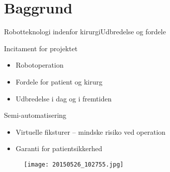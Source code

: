 \section{Baggrund}
\begin{frame}{Robotteknologi indenfor kirurgi}{Udbredelse og fordele}
\begin{minipage}[b]{0.55\linewidth}
\begin{block}{Incitament for projektet}
	\begin{itemize}
		\item Robotoperation
		\item Fordele for patient og kirurg
		\item Udbredelse i dag og i fremtiden
	\end{itemize}
\end{block}
\vspace{3mm}
\begin{block}{Semi-automatisering}
	\begin{itemize}
		\item Virtuelle fiksturer -- mindske risiko ved operation
		\item Garanti for patientsikkerhed
	\end{itemize}
\end{block}
\end{minipage}
	\hspace{0.1cm}
\begin{minipage}[b]{0.4\linewidth}
\begin{figure}[h]
\vspace{5mm}
\centering
\texttt{[image: 20150526\_102755.jpg]}
\end{figure}
\end{minipage}
\vspace{1cm}
\end{frame}

